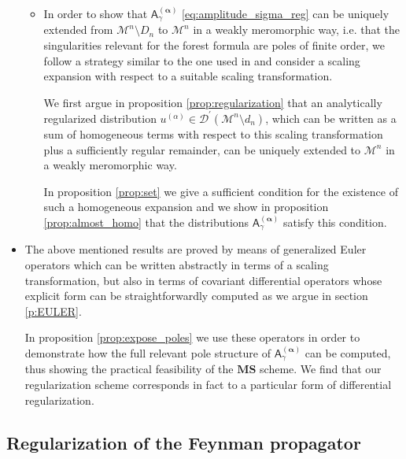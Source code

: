 \documentclass[11pt]{book}
\newcommand{\MS}{\textbf{MS}}
\newcommand{\alphabd}{\boldsymbol{\alpha}}
\newcommand{\Dcal}{\mathcal{D}}
\newcommand{\Mcal}{\mathcal{M}}
\newcommand{\Asf}{\mathsf{A}}
\theoremstyle{break}
\begin{document}
\begin{itemize}
\begin{itemize}
\item In order to show that $\Asf_\gamma^{(\alphabd)}$ \eqref{eq:amplitude_sigma_reg} can be uniquely extended from $\Mcal^n\setminus D_n$ to $\Mcal^n$ in a weakly meromorphic way, i.e. that the singularities relevant for the forest formula are poles of finite order, we follow a strategy similar to the one used in \cite{hollands_local_2001} and consider a scaling expansion with respect to a suitable scaling transformation. 

We first argue in proposition \ref{prop:regularization} that an analytically regularized distribution $u^{(\alpha)}\in\Dcal^\prime(\Mcal^n\setminus d_n)$, which can be written as a sum of homogeneous terms with respect to this scaling transformation plus a sufficiently regular remainder, can be uniquely extended to $\Mcal^n$ in a weakly meromorphic way.

In proposition \ref{prop:set} we give a sufficient condition for the existence of such a homogeneous expansion and we show in proposition \ref{prop:almost_homo} that the distributions $\Asf_\gamma^{(\alphabd)}$ satisfy this condition.

\end{itemize}


\item The above mentioned results are proved by means of generalized Euler operators which can be written abstractly in terms of a scaling transformation, but also in terms of covariant differential operators whose explicit form can be straightforwardly computed as we argue in section \ref{p:EULER}. 

In proposition \ref{prop:expose_poles} we use these operators in order to demonstrate how the full relevant pole structure of $\Asf_\gamma^{(\alphabd)}$ can be computed, thus showing the practical feasibility of the $\MS$ scheme. We find that our regularization scheme corresponds in fact to a particular form of differential regularization.


\end{itemize}



\subsection{Regularization of the Feynman propagator}
\label{p:REG_FEYNMAN_PROP}
\end{document}
